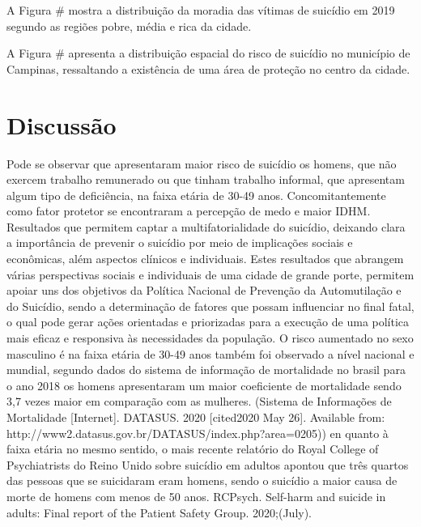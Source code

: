 A Figura \# mostra a distribuição da moradia das vítimas de suicídio em 2019 segundo as regiões pobre, média e rica da cidade.

A Figura \# apresenta a distribuição espacial do risco de suicídio no município de Campinas, ressaltando a existência de uma área de proteção no centro da cidade.

\section{Discussão}

Pode se observar que apresentaram maior risco de suicídio os homens, que não exercem trabalho remunerado ou que tinham trabalho informal, que apresentam algum tipo de deficiência, na faixa etária de 30-49 anos. Concomitantemente como fator protetor se encontraram a percepção de medo e maior IDHM. Resultados que permitem captar a multifatorialidade do suicídio, deixando clara a importância de prevenir o suicídio por meio de implicações sociais e econômicas, além aspectos clínicos e individuais.
Estes resultados que abrangem várias perspectivas sociais e individuais de uma cidade de grande porte, permitem apoiar uns dos objetivos da Política Nacional de Prevenção da Automutilação e do Suicídio, sendo a determinação de fatores que possam influenciar no final fatal, o qual pode gerar ações orientadas e priorizadas para a execução de uma política mais eficaz e responsiva às necessidades da população. 
O risco aumentado no sexo masculino é na faixa etária de 30-49 anos também foi observado a nível nacional e mundial, segundo dados do sistema de informação de mortalidade no brasil para o ano 2018 os homens apresentaram um maior coeficiente de mortalidade sendo 3,7 vezes maior em comparação com as mulheres. (Sistema de Informações de Mortalidade [Internet]. DATASUS. 2020 [cited2020 May 26]. Available from: http://www2.datasus.gov.br/DATASUS/index.php?area=0205))  en quanto à faixa etária no mesmo sentido, o mais recente relatório do Royal College of Psychiatrists do Reino Unido sobre suicídio em adultos apontou que três quartos das pessoas que se suicidaram eram homens, sendo o suicídio a maior causa de morte de homens com menos de 50 anos. RCPsych. Self-harm and suicide in adults: Final report of the Patient Safety Group. 2020;(July). 
